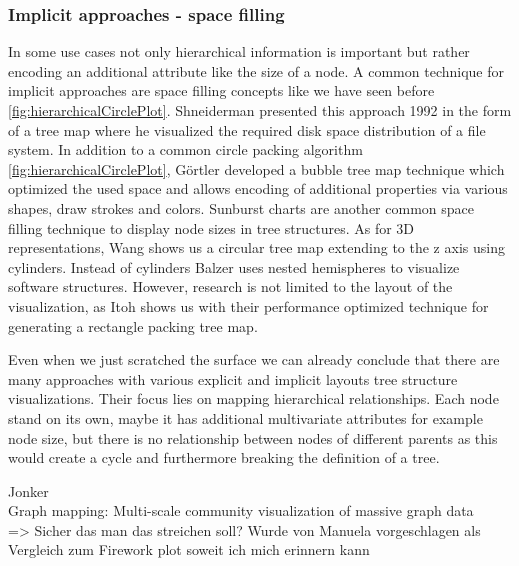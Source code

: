\subsubsection{Implicit approaches - space filling}
In some use cases not only hierarchical information is important but rather encoding an additional attribute like the size of a node. A common technique for implicit approaches are space filling concepts like we have seen before \ref{fig:hierarchicalCirclePlot}.
Shneiderman \cite{shneiderman_tree_1992} presented this approach 1992 in the form of a tree map where he visualized the required disk space distribution of a file system. In addition to a common circle packing algorithm \ref{fig:hierarchicalCirclePlot}, Görtler \cite{gortler_bubble_2018} developed a bubble tree map technique which optimized the used space and allows encoding of additional properties via various shapes, draw strokes and colors. Sunburst charts are another common space filling technique to display node sizes in tree structures. 
As for 3D representations, Wang \cite{wang_visualization_2006} shows us a circular tree map extending to the z axis using cylinders. Instead of cylinders Balzer \cite{balzer_hierarchy_2004} uses nested hemispheres to visualize software structures. 
However, research is not limited to the layout of the visualization, as Itoh \cite{itoh_hierarchical_2004} shows us with their performance optimized technique for generating a rectangle packing tree map.

Even when we just scratched the surface we can already conclude that there are many approaches with various explicit and implicit layouts tree structure visualizations. Their focus lies on mapping hierarchical relationships. Each node stand on its own, maybe it has additional multivariate attributes for example node size, but there is no relationship between nodes of different parents as this would create a cycle and furthermore breaking the definition of a tree.

Jonker\\
Graph mapping: Multi-scale community visualization of massive graph data\\
=> Sicher das man das streichen soll? Wurde von Manuela vorgeschlagen als Vergleich zum Firework plot soweit ich mich erinnern kann


